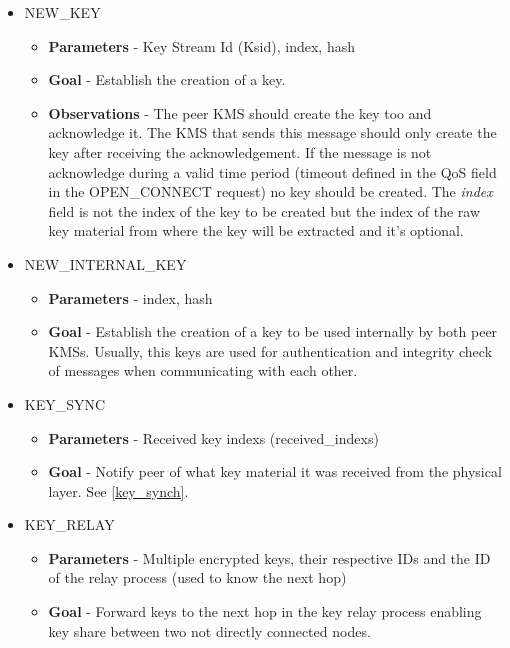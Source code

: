 \begin{refsection}
\begin{itemize}
	\item NEW\_KEY
		\begin{itemize}
			\item \textbf{Parameters} - Key Stream Id (Ksid), index, hash
			\item \textbf{Goal} - Establish the creation of a key.
			\item \textbf{Observations} - The peer KMS should create the key too and acknowledge it. The KMS that sends this message should only create the key after receiving the acknowledgement. If the message is not acknowledge during a valid time period (timeout defined in the QoS field in the OPEN\_CONNECT request) no key should be created. The \textit{index} field is not the index of the key to be created but the index of the raw key material from where the key will be extracted and it's optional.
		\end{itemize}
	\item NEW\_INTERNAL\_KEY
		\begin{itemize}
			\item \textbf{Parameters} - index, hash
			\item \textbf{Goal} - Establish the creation of a key to be used internally by both peer KMSs. Usually, this keys are used for authentication and integrity check of messages when communicating with each other.
		\end{itemize}
	\item KEY\_SYNC 
		\begin{itemize}
			\item \textbf{Parameters} - Received key indexs (received\_indexs)
			\item \textbf{Goal} - Notify peer of what key material it was received from the physical layer. See \ref{key_synch}.
		\end{itemize}
	\item KEY\_RELAY
		\begin{itemize}
			\item \textbf{Parameters} - Multiple encrypted keys, their respective IDs and the ID of the relay process (used to know the next hop)
			\item \textbf{Goal} - Forward keys to the next hop in the key relay process enabling key share between two not directly connected nodes. 
		\end{itemize}
\end{itemize}


\end{refsection}
